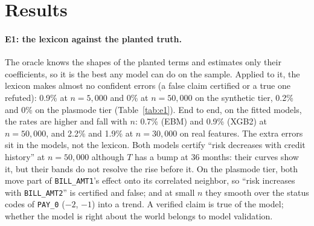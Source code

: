 \documentclass[11pt]{article}
\newcommand{\dsl}[1]{\texttt{#1}}
\begin{document}
\section{Results}

\paragraph{E1: the lexicon against the planted truth.} The oracle knows the shapes of the planted terms and estimates
only their coefficients, so it is the best any model can do on the sample. Applied to it, the lexicon makes almost no
confident
errors (a false claim certified or a true one refuted): 0.9\% at $n=5{,}000$ and 0\% at $n=50{,}000$ on the synthetic
tier, 0.2\% and 0\% on the plasmode tier (Table~\ref{tab:e1}). End to end, on the fitted models, the rates are higher
and fall with $n$: 0.7\% (EBM) and 0.9\% (XGB2) at $n=50{,}000$, and 2.2\% and 1.9\% at $n=30{,}000$ on real
features. The extra errors sit in the models, not the lexicon. Both models certify ``risk decreases with credit
history'' at $n=50{,}000$ although $T$ has a bump at 36 months: their curves show it, but their bands do not resolve
the rise before it. On the plasmode tier, both move part of \dsl{BILL\_AMT1}'s effect onto its correlated neighbor,
so ``risk increases with \dsl{BILL\_AMT2}'' is certified and false; and at small $n$ they smooth over the status codes
of \dsl{PAY\_0} ($-2$, $-1$) into a trend. A verified claim is true of the model; whether the model is right about the
world belongs to model validation.

\begin{table}[t]
\centering\footnotesize
\caption{E1 by tier and layer, pooled over the three seeds of each tier. On the synthetic tier, seed~1 is the discovery
seed on which the lexicon was calibrated (no threshold moved); on the two confirmation seeds alone, the oracle's
confident errors are 0.8\% ($n=5{,}000$) and 0\% ($n=50{,}000$). Data layer: the lexicon on the oracle; model layer: on
the fitted model against the oracle's labels; end to end: on the fitted model against $T$.}
\label{tab:e1}

\end{table}
\end{document}
